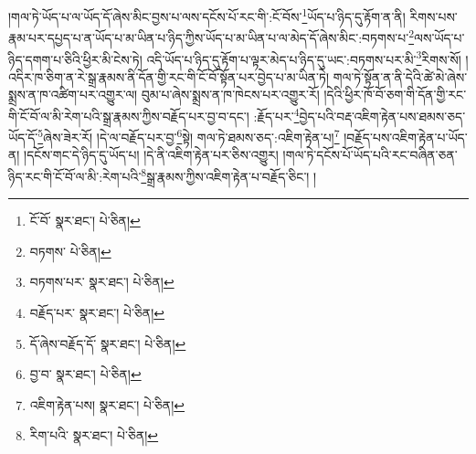།གལ་ཏེ་ཡོད་པ་ལ་ཡོད་དོ་ཞེས་མིང་བྱས་པ་ལས་དངོས་པོ་རང་གི་:ངོ་བོས་\footnote{ངོ་བོ་  སྣར་ཐང་།  པེ་ཅིན། }ཡོད་པ་ཉིད་དུ་རྟོག་ན་ནི། རིགས་པས་རྣམ་པར་དཔྱད་པ་ན་ཡོད་པ་མ་ཡིན་པ་ཉིད་ཀྱིས་ཡོད་པ་མ་ཡིན་པ་ལ་མེད་དོ་ཞེས་མིང་:བཏགས་པ་\footnote{བཏགས་  པེ་ཅིན། }ལས་ཡོད་པ་ཉིད་དགག་པ་ཅིའི་ཕྱིར་མི་ངེས་ཏེ། འདི་ཡོད་པ་ཉིད་དུ་རྟོག་པ་ལྟར་མེད་པ་ཉིད་དུ་ཡང་:བཏགས་པར་མི་\footnote{བཏགས་པར་  སྣར་ཐང་།  པེ་ཅིན། }རིགས་སོ། །འདིར་ཁ་ཅིག་ན་རེ་སྒྲ་རྣམས་ནི་དོན་གྱི་རང་གི་ངོ་བོ་སྟོན་པར་བྱེད་པ་མ་ཡིན་ཏེ། གལ་ཏེ་སྟོན་ན་ནི་དེའི་ཚེ་མེ་ཞེས་སྨྲས་ན་ཁ་འཚིག་པར་འགྱུར་ལ། བུམ་པ་ཞེས་སྨྲས་ན་ཁ་ཁེངས་པར་འགྱུར་རོ། །དེའི་ཕྱིར་ཁོ་བོ་ཅག་གི་དོན་གྱི་རང་གི་ངོ་བོ་ལ་མི་རེག་པའི་སྒྲ་རྣམས་ཀྱིས་བརྗོད་པར་བྱ་བ་དང་། :རྗོད་པར་\footnote{བརྗོད་པར་  སྣར་ཐང་།  པེ་ཅིན། }བྱེད་པའི་བརྡ་འཇིག་རྟེན་པས་ཐམས་ཅད་ཡོད་དོ་\footnote{དོ་ཞེས་བརྗོད་དོ་  སྣར་ཐང་།  པེ་ཅིན། }ཞེས་ཟེར་རོ། །དེ་ལ་བརྗོད་པར་བྱ་\footnote{བྱ་བ་  སྣར་ཐང་།  པེ་ཅིན། }སྟེ། གལ་ཏེ་ཐམས་ཅད་:འཇིག་རྟེན་པ།\footnote{འཇིག་རྟེན་པས།  སྣར་ཐང་།  པེ་ཅིན། } །བརྗོད་པས་འཇིག་རྟེན་པ་ཡོད་ན། །དངོས་གང་དེ་ཉིད་དུ་ཡོད་པ། །དེ་ནི་འཇིག་རྟེན་པར་ཅིས་འགྱུར། །གལ་ཏེ་དངོས་པོ་ཡོད་པའི་རང་བཞིན་ཅན་ཉིད་རང་གི་ངོ་བོ་ལ་མི་:རེག་པའི་\footnote{རིག་པའི་  སྣར་ཐང་།  པེ་ཅིན། }སྒྲ་རྣམས་ཀྱིས་འཇིག་རྟེན་པ་བརྗོད་ཅིང་། །
